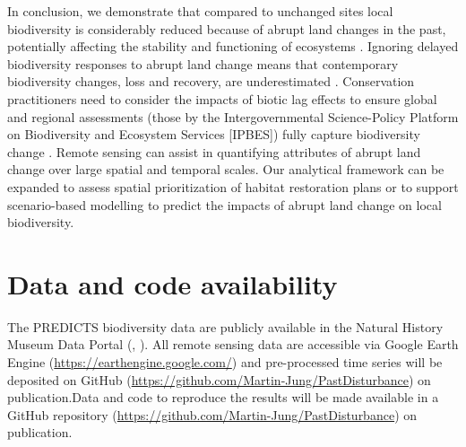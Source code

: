 In conclusion, we demonstrate that compared to unchanged sites local biodiversity is considerably reduced because of abrupt land changes in the past, potentially affecting the stability and functioning of ecosystems \citep{Hautier2015}. Ignoring delayed biodiversity responses to abrupt land change means that contemporary biodiversity changes, loss and recovery, are underestimated \citep{Kuussaari2009,Essl2015}. Conservation practitioners need to consider the impacts of biotic lag effects to ensure global and regional assessments (\eg those by the Intergovernmental Science-Policy Platform on Biodiversity and Ecosystem Services [IPBES]) fully capture biodiversity change \citep{Essl2015}. Remote sensing can assist in quantifying attributes of abrupt land change over large spatial and temporal scales. Our analytical framework can be expanded to assess spatial prioritization of habitat restoration plans or to support scenario-based modelling \citep{Ewers2009} to predict the impacts of abrupt land change on local biodiversity.

\section{Data and code availability}
\label{C03_05}
The PREDICTS biodiversity data are publicly available in the Natural History Museum Data Portal (, \cite{Hudson2016}). All remote sensing data are accessible via Google Earth Engine (\href{https://earthengine.google.com/}{https://earthengine.google.com/}) \citep{Gorelick2017} and pre-processed time series will be deposited on GitHub (\href{https://github.com/Martin-Jung/PastDisturbance}{https://github.com/Martin-Jung/PastDisturbance}) on publication.Data and code to reproduce the results will be made available in a GitHub repository (\href{https://github.com/Martin-Jung/PastDisturbance}{https://github.com/Martin-Jung/PastDisturbance}) on publication.

\clearpage
%

%  
